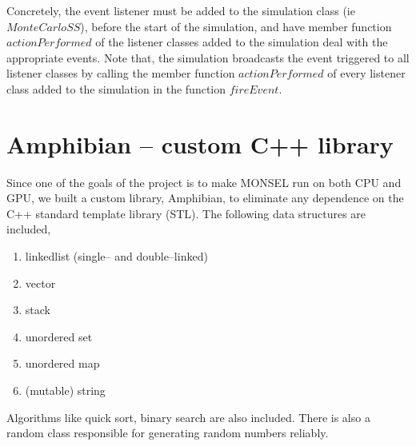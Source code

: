 Concretely, the event listener must be added to the simulation class (ie $MonteCarloSS$), before the start of the simulation, and have member function $actionPerformed$ of the listener classes added to the simulation deal with the appropriate events. Note that, the simulation broadcasts the event triggered to all listener classes by calling the member function $actionPerformed$ of every listener class added to the simulation in the function $fireEvent$.

\section{Amphibian -- custom C++ library}
Since one of the goals of the project is to make MONSEL run on both CPU and GPU, we built a custom library, Amphibian, to eliminate any dependence on the C++ standard template library (STL). The following data structures are included,
\begin{enumerate}
\item linkedlist (single-- and double--linked)
\item vector
\item stack
\item unordered set
\item unordered map
\item (mutable) string
\end{enumerate}

Algorithms like quick sort, binary search are also included. There is also a random class responsible for generating random numbers reliably.
